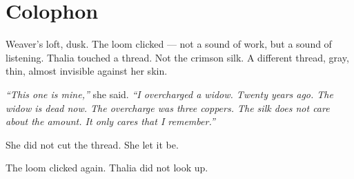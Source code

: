\section*{Colophon}
Weaver's loft, dusk. The loom clicked --- not a sound of work, but a sound of listening. Thalia touched a thread. Not the crimson silk. A different thread, gray, thin, almost invisible against her skin.

\textit{``This one is mine,''} she said. \textit{``I overcharged a widow. Twenty years ago. The widow is dead now. The overcharge was three coppers. The silk does not care about the amount. It only cares that I remember.''}

She did not cut the thread. She let it be.

The loom clicked again. Thalia did not look up.